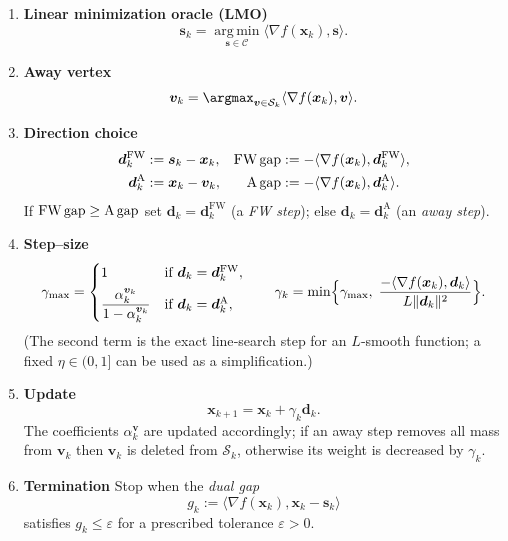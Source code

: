 \documentclass{article}
\newcommand{\argmin}{\operatorname*{arg\,min}}
\begin{document}
\begin{enumerate}[label=\textbf{Step \arabic*:}, leftmargin=*]
  \item \textbf{Linear minimization oracle (LMO)}  
  \[
  \bm{s}_{k}= \argmin_{\bm{s}\in\mathcal{C}} \langle \nabla f(\bm{x}_{k}),\bm{s}\rangle .
  \]
  \item \textbf{Away vertex}  
  \[
  \bm{v}_{k}= \argmax_{\bm{v}\in\mathcal{S}_{k}} \langle \nabla f(\bm{x}_{k}),\bm{v}\rangle .
  \]
  \item \textbf{Direction choice}  
  \[
  \begin{aligned}
  \bm{d}^{\text{FW}}_{k}&:=\bm{s}_{k}-\bm{x}_{k}, &
  \text{FW\,gap}&:= -\langle \nabla f(\bm{x}_{k}),\bm{d}^{\text{FW}}_{k}\rangle,\\
  \bm{d}^{\text{A}}_{k}&:=\bm{x}_{k}-\bm{v}_{k}, &
  \text{A\,gap}&:= -\langle \nabla f(\bm{x}_{k}),\bm{d}^{\text{A}}_{k}\rangle .
  \end{aligned}
  \]
  If $\text{FW\,gap}\ge\text{A\,gap}$ set $\bm{d}_{k}= \bm{d}^{\text{FW}}_{k}$ (a \emph{FW step}); else $\bm{d}_{k}= \bm{d}^{\text{A}}_{k}$ (an \emph{away step}).
  \item \textbf{Step–size}  
  \[
  \gamma_{\max}=
  \begin{cases}
  1 & \text{if }\bm{d}_{k}= \bm{d}^{\text{FW}}_{k},\\[4pt]
  \displaystyle\frac{\alpha_{k}^{\bm{v}_{k}}}{1-\alpha_{k}^{\bm{v}_{k}}} & \text{if }\bm{d}_{k}= \bm{d}^{\text{A}}_{k},
  \end{cases}
  \qquad
  \gamma_{k}= \min\Bigl\{\gamma_{\max},\; \frac{-\langle \nabla f(\bm{x}_{k}),\bm{d}_{k}\rangle}{L\|\bm{d}_{k}\|^{2}}\Big\}.
  \]
  (The second term is the exact line‑search step for an $L$‑smooth function; a fixed $\eta\in(0,1]$ can be used as a simplification.)
  \item \textbf{Update}  
  \[
  \bm{x}_{k+1}= \bm{x}_{k}+ \gamma_{k}\bm{d}_{k}.
  \]
  The coefficients $\alpha_{k}^{\bm{v}}$ are updated accordingly; if an away step removes all mass from $\bm{v}_{k}$ then $\bm{v}_{k}$ is deleted from $\mathcal{S}_{k}$, otherwise its weight is decreased by $\gamma_{k}$.
  \item \textbf{Termination}  
  Stop when the \emph{dual gap}
  \[
  g_{k}:= \langle \nabla f(\bm{x}_{k}),\bm{x}_{k}-\bm{s}_{k}\rangle
  \]
  satisfies $g_{k}\le\varepsilon$ for a prescribed tolerance $\varepsilon>0$.
\end{enumerate}
\end{document}
